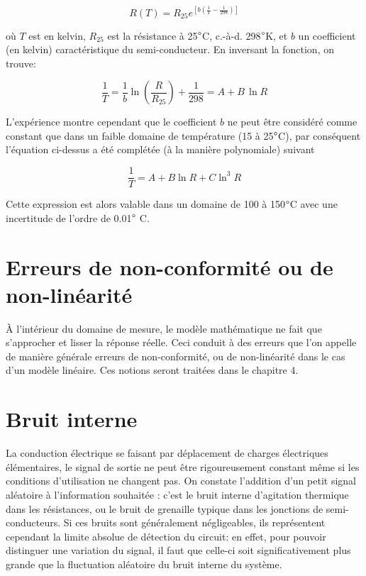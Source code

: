 \documentclass[main.tex]{subfiles}
\begin{document}
\begin{equation}
    R(T) = R_{25}e^{\left[b\left(\frac{1}{T}-\frac{1}{298}\right)\right]}
\end{equation}

où $T$ est en kelvin, $R_{25}$ est la résistance à 25$\degree$C, c.-à-d. 298$\degree$K, et $b$ un coefficient (en kelvin) caractéristique du semi-conducteur. En inversant la fonction, on trouve:

\begin{equation}
    \frac{1}{T} = \frac{1}{b}\ln{\left(\frac{R}{R_{25}}\right)}+\frac{1}{298} = A + B\,\ln{R}
\end{equation}

L'expérience montre cependant que le coefficient $b$ ne peut être considéré comme constant que dans un faible domaine de température (15 à 25$\degree$C), par conséquent l'équation ci-dessus a été complétée (à la manière polynomiale) suivant

\begin{equation}
    \frac{1}{T} = A + B \ln{R} + C \ln^3{R}
\end{equation}

Cette expression est alors valable dans un domaine de 100 à 150$\degree$C avec une incertitude de l'ordre de 0.01$\degree$ C.

\section{Erreurs de non-conformité ou de non-linéarité}

À l'intérieur du domaine de mesure, le modèle mathématique ne fait que s'approcher et lisser la réponse réelle. Ceci conduit à des erreurs que l'on appelle de manière générale erreurs de non-conformité, ou de non-linéarité dans le cas d'un modèle linéaire. Ces notions seront traitées dans le chapitre 4.

\section{Bruit interne}

La conduction électrique se faisant par déplacement de charges électriques élémentaires, le signal de sortie ne peut être rigoureusement constant même si les conditions d'utilisation ne changent pas. On constate l'addition d'un petit signal aléatoire à l'information souhaitée : c'est le bruit interne d'agitation thermique dans les résistances, ou le bruit de grenaille typique dans les jonctions de semi-conducteurs. Si ces bruits sont généralement négligeables, ils représentent cependant la limite absolue de détection du circuit: en effet, pour pouvoir distinguer une variation du signal, il faut que celle-ci soit significativement plus grande que la fluctuation aléatoire du bruit interne du système.
\end{document}
